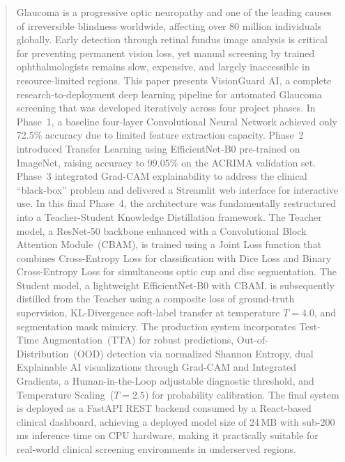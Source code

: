 \documentclass[conference]{IEEEtran}
\begin{document}
\begin{abstract}
Glaucoma is a progressive optic neuropathy and one of the leading causes of irreversible blindness worldwide, affecting over 80 million individuals globally. Early detection through retinal fundus image analysis is critical for preventing permanent vision loss, yet manual screening by trained ophthalmologists remains slow, expensive, and largely inaccessible in resource-limited regions. This paper presents VisionGuard AI, a complete research-to-deployment deep learning pipeline for automated Glaucoma screening that was developed iteratively across four project phases. In Phase~1, a baseline four-layer Convolutional Neural Network achieved only 72.5\% accuracy due to limited feature extraction capacity. Phase~2 introduced Transfer Learning using EfficientNet-B0 pre-trained on ImageNet, raising accuracy to 99.05\% on the ACRIMA validation set. Phase~3 integrated Grad-CAM explainability to address the clinical ``black-box'' problem and delivered a Streamlit web interface for interactive use. In this final Phase~4, the architecture was fundamentally restructured into a Teacher-Student Knowledge Distillation framework. The Teacher model, a ResNet-50 backbone enhanced with a Convolutional Block Attention Module~(CBAM), is trained using a Joint Loss function that combines Cross-Entropy Loss for classification with Dice Loss and Binary Cross-Entropy Loss for simultaneous optic cup and disc segmentation. The Student model, a lightweight EfficientNet-B0 with CBAM, is subsequently distilled from the Teacher using a composite loss of ground-truth supervision, KL-Divergence soft-label transfer at temperature $T{=}4.0$, and segmentation mask mimicry. The production system incorporates Test-Time Augmentation~(TTA) for robust predictions, Out-of-Distribution~(OOD) detection via normalized Shannon Entropy, dual Explainable AI visualizations through Grad-CAM and Integrated Gradients, a Human-in-the-Loop adjustable diagnostic threshold, and Temperature Scaling~($T{=}2.5$) for probability calibration. The final system is deployed as a FastAPI REST backend consumed by a React-based clinical dashboard, achieving a deployed model size of 24\,MB with sub-200\,ms inference time on CPU hardware, making it practically suitable for real-world clinical screening environments in underserved regions.
\end{abstract}
\end{document}
